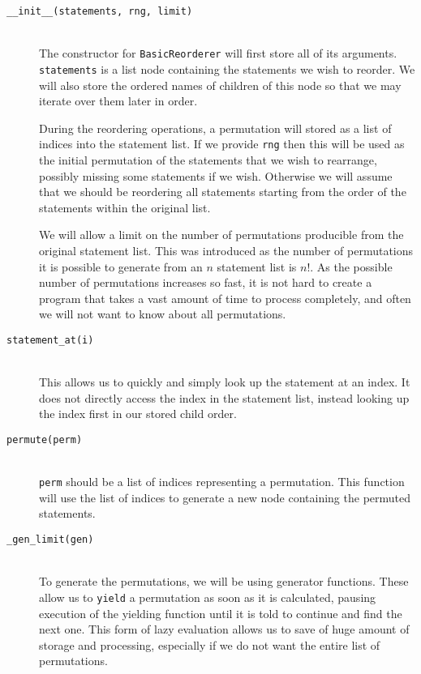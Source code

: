 \documentclass{report}
\begin{document}
\begin{description}
\item[\texttt{\_\_init\_\_(statements, rng, limit)}] \hfill \\
The constructor for \texttt{BasicReorderer} will first store all of its arguments. \texttt{statements} is a list node containing the statements we wish to
reorder. We will also store the ordered names of children of this node so that we may iterate over them later in order.

During the reordering operations, a permutation will stored as a list of indices into the statement list. If we provide \texttt{rng} then this will be
used as the initial permutation of the statements that we wish to rearrange, possibly missing some statements if we wish. Otherwise we will assume
that we should be reordering all statements starting from the order of the statements within the original list.

We will allow a limit on the number of permutations producible from the original statement list. This was introduced as the number of permutations it
is possible to generate from an $n$ statement list is $n!$. As the possible number of permutations increases so fast, it is not hard to create a program
that takes a vast amount of time to process completely, and often we will not want to know about all permutations.

\item[\texttt{statement\_at(i)}] \hfill \\
This allows us to quickly and simply look up the statement at an index. It does not directly access the index in the statement list, instead looking up
the index first in our stored child order.

\item[\texttt{permute(perm)}] \hfill \\
\texttt{perm} should be a list of indices representing a permutation. This function will use the list of indices to generate a new node containing the
permuted statements.

\item[\texttt{\_gen\_limit(gen)}] \hfill \\
To generate the permutations, we will be using generator functions. These allow us to \texttt{yield} a permutation as soon as it is calculated, pausing
execution of the yielding function until it is told to continue and find the next one. This form of lazy evaluation allows us to save of huge amount
of storage and processing, especially if we do not want the entire list of permutations.


\end{description}
\end{document}
